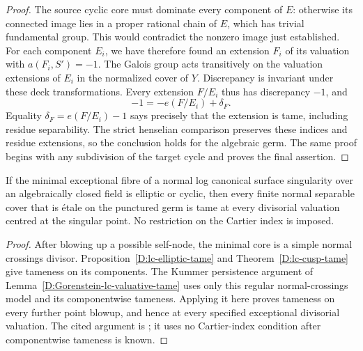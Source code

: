 \begin{proof}
The source cyclic core must dominate every
component of $E$: otherwise its connected image
lies in a proper rational chain of $E$, which
has trivial fundamental group.  This would
contradict the nonzero image just established.
For each component $E_i$, we have therefore
found an extension $F_i$ of its valuation with
$a(F_i,S')=-1$.
The Galois group acts transitively on the
valuation extensions of $E_i$ in the normalized
cover of $Y$.  Discrepancy is invariant under
these deck transformations.  Every extension
$F/E_i$ thus has discrepancy $-1$, and
\[
 -1=-e(F/E_i)+\delta_F.
\]
Equality $\delta_F=e(F/E_i)-1$ says precisely
that the extension is tame, including residue
separability.  The strict henselian comparison
preserves these indices and residue extensions,
so the conclusion holds for the algebraic germ.
The same proof begins with any subdivision of
the target cycle and proves the final assertion.
\end{proof}

\begin{corollary}
\label{D:lc-core-valuative-tame}
If the minimal exceptional fibre of a normal
log canonical surface singularity over an
algebraically closed field is elliptic or cyclic,
then every finite normal separable cover that
is \'etale on the punctured germ is tame at every
divisorial valuation centred at the singular point.
No restriction on the Cartier index is imposed.
\end{corollary}
\begin{proof}
After blowing up a possible self-node, the
minimal core is a simple normal crossings
divisor.  Proposition~\ref{D:lc-elliptic-tame}
and Theorem~\ref{D:lc-cusp-tame} give tameness
on its components.  The Kummer persistence
argument of Lemma~\ref{D:Gorenstein-lc-valuative-tame}
uses only this regular normal-crossings model
and its componentwise tameness.  Applying it
here proves tameness on every further point
blowup, and hence at every specified exceptional
divisorial valuation.  The cited argument is
\cite[XIII, Proposition 5.2 and Corollary 5.3,
pp.~428--430]{SGA1}; it uses no Cartier-index
condition after componentwise tameness is known.
\end{proof}
